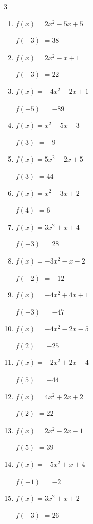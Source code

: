 \begin{multicols}{3}
\begin{enumerate}
$f(1)$
        $= 3$

\columnbreak %

  \item $f(x)=2x^{2}-5x+5$

$f(-3)$
        $= 38$

  \item $f(x)=2x^{2}-x+1$

$f(-3)$
        $= 22$

  \item $f(x)=-4x^{2}-2x+1$

$f(-5)$
        $= -89$

  \item $f(x)=x^{2}-5x-3$

$f(3)$
        $= -9$

  \item $f(x)=5x^{2}-2x+5$

$f(3)$
        $= 44$

  \item $f(x)=x^{2}-3x+2$

$f(4)$
        $= 6$

  \item $f(x)=3x^{2}+x+4$

$f(-3)$
        $= 28$

  \item $f(x)=-3x^{2}-x-2$

$f(-2)$
        $= -12$

  \item $f(x)=-4x^{2}+4x+1$

$f(-3)$
        $= -47$

  \item $f(x)=-4x^{2}-2x-5$

$f(2)$
        $= -25$

  \item $f(x)=-2x^{2}+2x-4$

$f(5)$
        $= -44$

  \item $f(x)=4x^{2}+2x+2$

$f(2)$
        $= 22$

  \item $f(x)=2x^{2}-2x-1$

$f(5)$
        $= 39$

  \item $f(x)=-5x^{2}+x+4$

$f(-1)$
        $= -2$

  \item $f(x)=3x^{2}+x+2$

$f(-3)$
        $= 26$

\end{enumerate}
\end{multicols}
